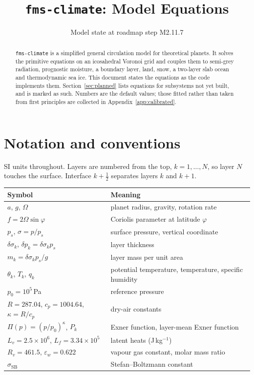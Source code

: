 \documentclass[11pt,a4paper]{article}
\title{\texttt{fms-climate}: Model Equations}
\date{Model state at roadmap step M2.11.7}
\begin{document}
\maketitle

\begin{abstract}
\texttt{fms-climate} is a simplified general circulation model for theoretical
planets. It solves the primitive equations on an icosahedral Voronoi grid and
couples them to semi-grey radiation, prognostic moisture, a boundary layer, land,
snow, a two-layer slab ocean and thermodynamic sea ice. This document states the
equations as the code implements them. Section~\ref{sec:planned} lists equations
for subsystems not yet built, and is marked as such. Numbers are the default
values; those fitted rather than taken from first principles are collected in
Appendix~\ref{app:calibrated}.
\end{abstract}

\tableofcontents

\section{Notation and conventions}

SI units throughout. Layers are numbered from the top, $k = 1,\dots,N$, so layer
$N$ touches the surface. Interface $k+\tfrac12$ separates layers $k$ and $k+1$.

\begin{center}
\begin{tabular}{@{}ll@{}}
\toprule
Symbol & Meaning \\
\midrule
$a$, $g$, $\Omega$ & planet radius, gravity, rotation rate \\
$f = 2\Omega\sin\varphi$ & Coriolis parameter at latitude $\varphi$ \\
$p_s$, $\sigma = p/p_s$ & surface pressure, vertical coordinate \\
$\delta\sigma_k$, $\delta p_k = \delta\sigma_k p_s$ & layer thickness \\
$m_k = \delta\sigma_k p_s / g$ & layer mass per unit area \\
$\theta_k$, $T_k$, $q_k$ & potential temperature, temperature, specific humidity \\
$p_0 = 10^5$\,Pa & reference pressure \\
$R = 287.04$, $c_p = 1004.64$, $\kappa = R/c_p$ & dry-air constants \\
$\Pi(p) = (p/p_0)^\kappa$, $P_k$ & Exner function, layer-mean Exner function \\
$L_v = 2.5\times10^6$, $L_f = 3.34\times10^5$ & latent heats (J\,kg$^{-1}$) \\
$R_v = 461.5$, $\varepsilon_w = 0.622$ & vapour gas constant, molar mass ratio \\
$\sigma_{\mathrm{SB}}$ & Stefan--Boltzmann constant \\
\bottomrule
\end{tabular}
\end{center}
\end{document}
